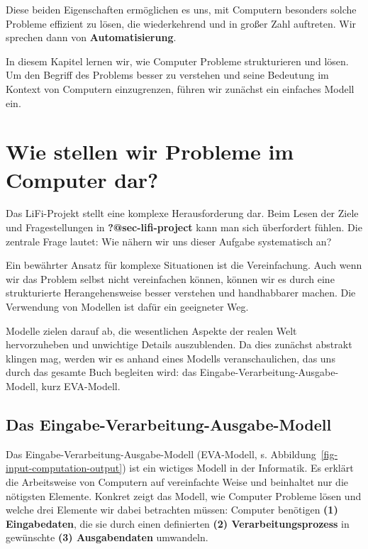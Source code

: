 \documentclass[
  letterpaper,
  DIV=11]{scrreprt}
\begin{document}
Diese beiden Eigenschaften ermöglichen es uns, mit Computern besonders
solche Probleme effizient zu lösen, die wiederkehrend und in großer Zahl
auftreten. Wir sprechen dann von \textbf{Automatisierung}.

In diesem Kapitel lernen wir, wie Computer Probleme strukturieren und
lösen. Um den Begriff des Problems besser zu verstehen und seine
Bedeutung im Kontext von Computern einzugrenzen, führen wir zunächst ein
einfaches Modell ein.

\section{Wie stellen wir Probleme im Computer
dar?}\label{wie-stellen-wir-probleme-im-computer-dar}

Das LiFi-Projekt stellt eine komplexe Herausforderung dar. Beim Lesen
der Ziele und Fragestellungen in \textbf{?@sec-lifi-project} kann man
sich überfordert fühlen. Die zentrale Frage lautet: Wie nähern wir uns
dieser Aufgabe systematisch an?

Ein bewährter Ansatz für komplexe Situationen ist die Vereinfachung.
Auch wenn wir das Problem selbst nicht vereinfachen können, können wir
es durch eine strukturierte Herangehensweise besser verstehen und
handhabbarer machen. Die Verwendung von Modellen ist dafür ein
geeigneter Weg.

Modelle zielen darauf ab, die wesentlichen Aspekte der realen Welt
hervorzuheben und unwichtige Details auszublenden. Da dies zunächst
abstrakt klingen mag, werden wir es anhand eines Modells
veranschaulichen, das uns durch das gesamte Buch begleiten wird: das
Eingabe-Verarbeitung-Ausgabe-Modell, kurz EVA-Modell.

\subsection{Das
Eingabe-Verarbeitung-Ausgabe-Modell}\label{das-eingabe-verarbeitung-ausgabe-modell}

Das Eingabe-Verarbeitung-Ausgabe-Modell (EVA-Modell, s.
Abbildung~\ref{fig-input-computation-output}) ist ein wictiges Modell in
der Informatik. Es erklärt die Arbeitsweise von Computern auf
vereinfachte Weise und beinhaltet nur die nötigsten Elemente. Konkret
zeigt das Modell, wie Computer Probleme lösen und welche drei Elemente
wir dabei betrachten müssen: Computer benötigen \textbf{(1)
Eingabedaten}, die sie durch einen definierten \textbf{(2)
Verarbeitungsprozess} in gewünschte \textbf{(3) Ausgabendaten}
umwandeln.
\end{document}
